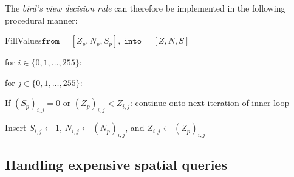 The \textit{bird's view decision rule} can therefore be implemented in the following procedural manner:
\begin{pseudofunc}{FillValues}{$\texttt{from}=[Z_p, N_p, S_p],~\texttt{into}=[Z, N, S]$}
  \item for $i \in \{0, 1, \ldots, 255\}$:
  \begin{pseudoloop}
    \item for $j \in \{0, 1, \ldots, 255\}$:
    \begin{pseudoloop}
      \item If $(S_p)_{i,j} = 0$ or $(Z_p)_{i,j} < Z_{i,j}$: continue onto next iteration of inner loop
      \item Insert $S_{i,j} \leftarrow 1$, $N_{i,j} \leftarrow (N_p)_{i,j}$, and $Z_{i,j} \leftarrow (Z_p)_{i,j}$
    \end{pseudoloop}
  \end{pseudoloop}
\end{pseudofunc}

\subsection{Handling expensive spatial queries}

